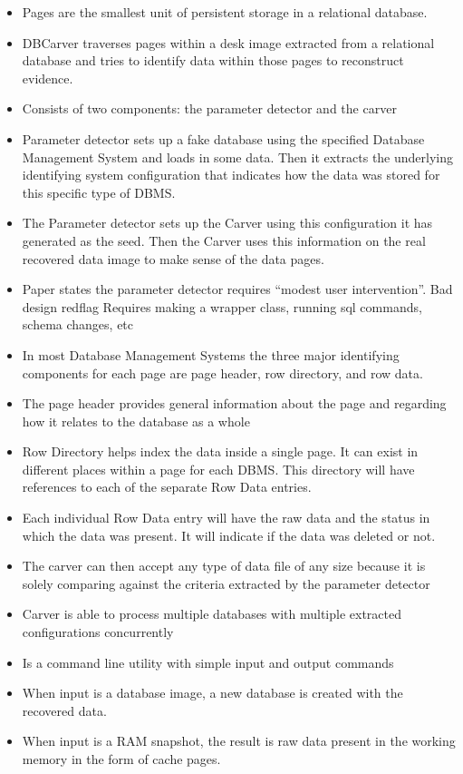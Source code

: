 \documentclass[11pt,]{article}
\begin{document}
\begin{itemize}
\item
  Pages are the smallest unit of persistent storage in a relational
  database.
\item
  DBCarver traverses pages within a desk image extracted from a
  relational database and tries to identify data within those pages to
  reconstruct evidence.
\item
  Consists of two components: the parameter detector and the carver
\item
  Parameter detector sets up a fake database using the specified
  Database Management System and loads in some data. Then it extracts
  the underlying identifying system configuration that indicates how the
  data was stored for this specific type of DBMS.
\item
  The Parameter detector sets up the Carver using this configuration it
  has generated as the seed. Then the Carver uses this information on
  the real recovered data image to make sense of the data pages.
\item
  Paper states the parameter detector requires ``modest user
  intervention''. Bad design redflag Requires making a wrapper class,
  running sql commands, schema changes, etc
\item
  In most Database Management Systems the three major identifying
  components for each page are page header, row directory, and row data.
\item
  The page header provides general information about the page and
  regarding how it relates to the database as a whole
\item
  Row Directory helps index the data inside a single page. It can exist
  in different places within a page for each DBMS. This directory will
  have references to each of the separate Row Data entries.
\item
  Each individual Row Data entry will have the raw data and the status
  in which the data was present. It will indicate if the data was
  deleted or not.
\item
  The carver can then accept any type of data file of any size because
  it is solely comparing against the criteria extracted by the parameter
  detector
\item
  Carver is able to process multiple databases with multiple extracted
  configurations concurrently
\item
  Is a command line utility with simple input and output commands
\item
  When input is a database image, a new database is created with the
  recovered data.
\item
  When input is a RAM snapshot, the result is raw data present in the
  working memory in the form of cache pages.
\end{itemize}
\end{document}
